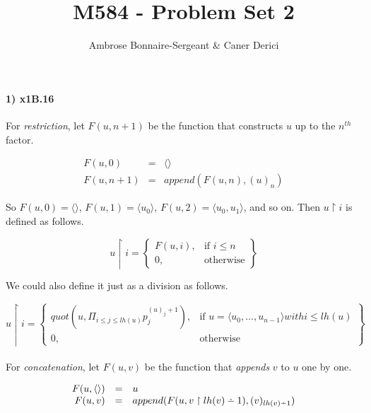 \documentclass{article}
\title{M584 - Problem Set 2}
\author{}
\date{Ambrose Bonnaire-Sergeant \& Caner Derici}
\providecommand{\dotdiv}{%
  \mathbin{%
    \vphantom{+}%
    \text{%
      \mathsurround=0pt %
      \ooalign{%
        \noalign{\kern-.35ex}%
        \hidewidth$\smash{\cdot}$\hidewidth\cr %
        \noalign{\kern.35ex}%
        $-$\cr %
      }%
    }%
  }%
}
\begin{document}

\maketitle%

\paragraph{1) x1B.16} For \textit{restriction}, let $F(u,n+1)$ be the function that constructs $u$ up to the $n^{th}$ factor.

\[
\begin{array}{rcl}
F(u,0) & = & \langle\rangle \\

F(u, n+1) & = & append(F(u,n),(u)_n)
\end{array}
\]

So $F(u,0) = \langle\rangle$, $F(u,1) = \langle u_0 \rangle$, $F(u,2) = \langle u_0, u_1 \rangle$, and so on. Then $u \upharpoonright i$ is defined as follows.

\[
u \upharpoonright i = \left\{\begin{array}{lr}
    F(u,i), & \text{if } i\leq n \\
    0, & \text{otherwise}
  \end{array}\right\}
\]

We could also define it just as a division as follows.

\[
u \upharpoonright i = \left\{\begin{array}{lr}

  quot(u, \Pi_{i\leq j\leq lh(u)} p_j^{(u)_j+1}), & \text{if } u=\langle u_0, \ldots, u_{n-1}\rangle with i\leq lh(u) \\

    0, & \text{otherwise}
  \end{array}\right\}
\]

\paragraph{} For \textit{concatenation}, let $F(u,v)$ be the function that \emph{appends} $v$ to $u$ one by one.

\[
\begin{array}{rcl}
F(u,\langle\rangle) & = & u \\

F(u,v) & = & append(F(u, v \upharpoonright lh(v)\dotdiv 1), (v)_{lh(v)\dotdiv 1})
\end{array}
\]
\end{document}
